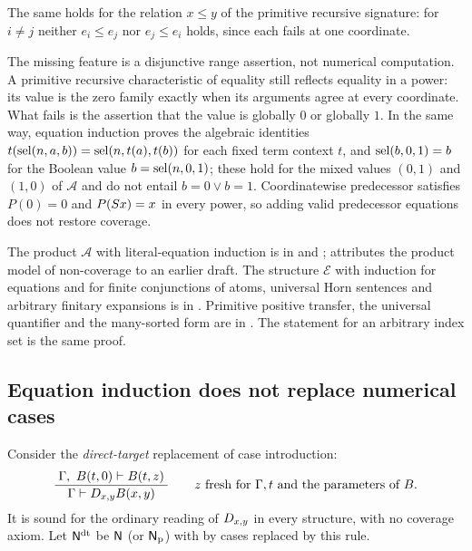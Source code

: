 The same holds for the relation $x\le y$ of the primitive recursive signature:
for $i\ne j$ neither $e_i\le e_j$ nor $e_j\le e_i$ holds, since each fails at
one coordinate.

\begin{remark}
\label{obs:rem:boolean}
The missing feature is a disjunctive range assertion, not numerical
computation. A primitive recursive characteristic of equality still reflects
equality in a power: its value is the zero family exactly when its arguments
agree at every coordinate. What fails is the assertion that the value is
globally $0$ or globally $1$. In the same way, equation induction proves the
algebraic identities $t(\operatorname{sel}(n,a,b))=\operatorname{sel}(n,t(a),t(b))$ for each fixed term
context $t$, and $\operatorname{sel}(b,0,1)=b$ for the Boolean value $b=\operatorname{sel}(n,0,1)$; these
hold for the mixed values $(0,1)$ and $(1,0)$ of $\mathcal{A}$ and do not
entail $b=0\vee b=1$. Coordinatewise predecessor satisfies $P(0)=0$ and
$P(S x)=x$ in every power, so adding valid predecessor equations does not
restore coverage.
\end{remark}

\begin{remark}
The product $\mathcal{A}$ with literal-equation induction is in
 and ; 
attributes the product model of non-coverage to an earlier draft. The structure
$\mathcal{E}$ with induction for equations and for finite conjunctions of
atoms, universal Horn sentences and arbitrary finitary expansions is in
. Primitive positive transfer, the universal quantifier and the
many-sorted form are in . The statement for an arbitrary
index set is the same proof. %
\end{remark}

\subsection{Equation induction does not replace numerical cases}

Consider the \emph{direct-target} replacement of case introduction:
\[
\dfrac{\;\Gamma,\ B(t,0)\vdash B(t,z)\;}{\;\Gamma\vdash D_{x,y}B(x,y)\;}
\qquad z \text{ fresh for } \Gamma,t \text{ and the parameters of } B .
\]
It is sound for the ordinary reading of $D_{x,y}$ in every structure, with no
coverage axiom. Let $\mathsf{N}^{\mathrm{dt}}$ be $\mathsf{N}$ (or $\mathsf{N}_{\mathrm{p}}$)
with  by cases replaced by this rule.

